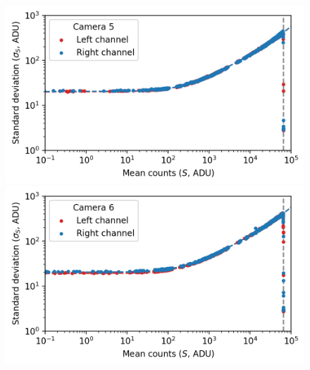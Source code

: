\begin{colsection}
\begin{figure}[p]
\begin{center}
        \begin{minipage}[t]{0.49\linewidth}\vspace{10pt}
            \includegraphics[width=\linewidth]{images/detectors/ptc_5.png}
        \end{minipage}
        \begin{minipage}[t]{0.49\linewidth}\vspace{10pt}
            \includegraphics[width=\linewidth]{images/detectors/ptc_6.png}
        \end{minipage}


\end{center}
\end{figure}
\end{colsection}
